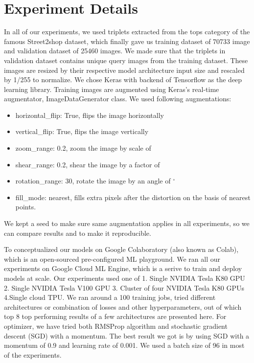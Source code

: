 \documentclass[10pt,twocolumn,letterpaper]{article}
\newcommand{\rpm}{\raisebox{.2ex}{$\scriptstyle\pm$}}
\begin{document}
\section{Experiment Details}In all of our experiments, we used triplets extracted from the tops category of the famous Street2shop dataset, which finally gave us training dataset of 70733 image and validation dataset of 25460 images. We made sure that the triplets in validation dataset contains unique query images from the training dataset. These images are resized by their respective model architecture input size and rescaled by 1/255 to normalize. We chose Keras \cite{c34} with backend of Tensorflow \cite{c35} as the deep learning library. Training images are augmented using Keras's real-time augmentator, ImageDataGenerator class. We used following augmentations:
\vspace{-2mm}
\begin{itemize}
\itemsep-0.2em
\item horizontal\_flip: True, flips the image horizontally
\item vertical\_flip: True, flips the image vertically
\item zoom\_range: 0.2, zoom the image by scale of \rpm{0.2}
\item shear\_range: 0.2, shear the image by a factor of \rpm{0.2}
\item rotation\_range: 30, rotate the image by an angle of \rpm{30}$^{\circ}$
\item fill\_mode: nearest, fills extra pixels after the distortion on the basis of nearest points.
\end{itemize}
We kept a seed to make sure same augmentation applies in all experiments, so we can compare results and to make it reproducible.

To conceptualized our models on Google Colaboratory (also known as Colab), which is an open-sourced pre-configured ML playground. We ran all our experiments on Google Cloud ML Engine, which is a serive to train and deploy models at scale. Our experiments used one of 1. Single NVIDIA Tesla K80 GPU 2. Single NVIDIA Tesla V100 GPU 3. Cluster of four NVIDIA Tesla K80 GPUs 4.Single cloud TPU. We ran around a 100 training jobs, tried different architectures or combination of losses and other hyperparameters, out of which top 8 top performing results of a few architectures are presented here. For optimizer, we have tried both RMSProp algorithm and stochastic gradient descent (SGD) with a momentum. The best result we got is by using SGD with a momentum of 0.9 and learning rate of 0.001. We used a batch size of 96 in most of the experiments.
\end{document}
